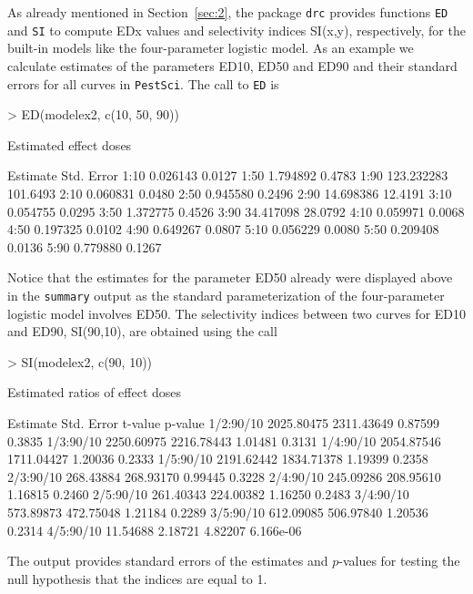 \documentclass[a4paper]{article}
\begin{document}
As already mentioned in Section~\ref{sec:2}, the package \verb+drc+  provides functions \verb+ED+ and \verb+SI+ to compute EDx values 
and selectivity indices SI(x,y), respectively, for the built-in models like the four-parameter logistic model. As an example we calculate 
estimates of the parameters ED10, ED50 and ED90 and their standard errors for all curves in \verb+PestSci+. The call to \verb+ED+ is

\begin{Schunk}
\begin{Sinput}
> ED(modelex2, c(10, 50, 90))
\end{Sinput}
\begin{Soutput}
Estimated effect doses

       Estimate Std. Error
1:10   0.026143     0.0127
1:50   1.794892     0.4783
1:90 123.232283   101.6493
2:10   0.060831     0.0480
2:50   0.945580     0.2496
2:90  14.698386    12.4191
3:10   0.054755     0.0295
3:50   1.372775     0.4526
3:90  34.417098    28.0792
4:10   0.059971     0.0068
4:50   0.197325     0.0102
4:90   0.649267     0.0807
5:10   0.056229     0.0080
5:50   0.209408     0.0136
5:90   0.779880     0.1267
\end{Soutput}
\end{Schunk}
Notice that the estimates for the parameter ED50 already were displayed above in the \verb+summary+ output as the standard parameterization of the
four-parameter logistic model involves ED50.
The selectivity indices between two curves for ED10 and ED90, SI(90,10), are obtained using the call

\begin{Schunk}
\begin{Sinput}
> SI(modelex2, c(90, 10))
\end{Sinput}
\begin{Soutput}
Estimated ratios of effect doses

            Estimate Std. Error    t-value   p-value
1/2:90/10 2025.80475 2311.43649    0.87599    0.3835
1/3:90/10 2250.60975 2216.78443    1.01481    0.3131
1/4:90/10 2054.87546 1711.04427    1.20036    0.2333
1/5:90/10 2191.62442 1834.71378    1.19399    0.2358
2/3:90/10  268.43884  268.93170    0.99445    0.3228
2/4:90/10  245.09286  208.95610    1.16815    0.2460
2/5:90/10  261.40343  224.00382    1.16250    0.2483
3/4:90/10  573.89873  472.75048    1.21184    0.2289
3/5:90/10  612.09085  506.97840    1.20536    0.2314
4/5:90/10   11.54688    2.18721    4.82207 6.166e-06
\end{Soutput}
\end{Schunk}
The output provides standard errors of the estimates and $p$-values for testing the null hypothesis that the indices are equal to 1. 
\end{document}
